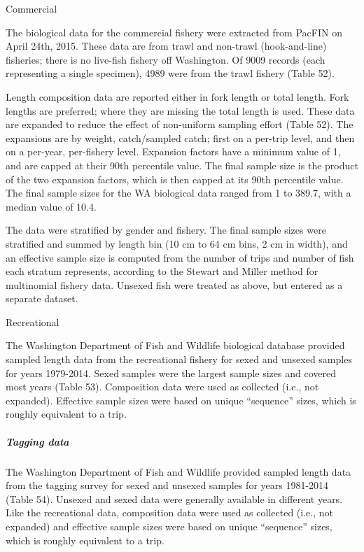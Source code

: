 \documentclass[11pt,
  english,
  letterpaper,
]{article}
\begin{document}
Commercial

The biological data for the commercial fishery were extracted from PacFIN on April 24th, 2015. These data are from trawl and non-trawl (hook-and-line) fisheries; there is no live-fish fishery off Washington. Of 9009 records (each representing a single specimen), 4989 were from the trawl fishery (Table 52).

Length composition data are reported either in fork length or total length. Fork lengths are preferred; where they are missing the total length is used. These data are expanded to reduce the effect of non-uniform sampling effort (Table 52). The expansions are by weight, catch/sampled catch; first on a per-trip level, and then on a per-year, per-fishery level. Expansion factors have a minimum value of 1, and are capped at their 90th percentile value. The final sample size is the product of the two expansion factors, which is then capped at its 90th percentile value. The final sample sizes for the WA biological data ranged from 1 to 389.7, with a median value of 10.4.

The data were stratified by gender and fishery. The final sample sizes were stratified and summed by length bin (10 cm to 64 cm bins, 2 cm in width), and an effective sample size is computed from the number of trips and number of fish each stratum represents, according to the Stewart and Miller method for multinomial fishery data. Unsexed fish were treated as above, but entered as a separate dataset.

Recreational

The Washington Department of Fish and Wildlife biological database provided sampled length data from the recreational fishery for sexed and unsexed samples for years 1979-2014. Sexed samples were the largest sample sizes and covered most years (Table 53). Composition data were used as collected (i.e., not expanded). Effective sample sizes were based on unique ``sequence'' sizes, which is roughly equivalent to a trip.

\hypertarget{tagging-data}{%
\subparagraph{Tagging data}\label{tagging-data}}

The Washington Department of Fish and Wildlife provided sampled length data from the tagging survey for sexed and unsexed samples for years 1981-2014 (Table 54). Unsexed and sexed data were generally available in different years. Like the recreational data, composition data were used as collected (i.e., not expanded) and effective sample sizes were based on unique ``sequence'' sizes, which is roughly equivalent to a trip.
\end{document}
